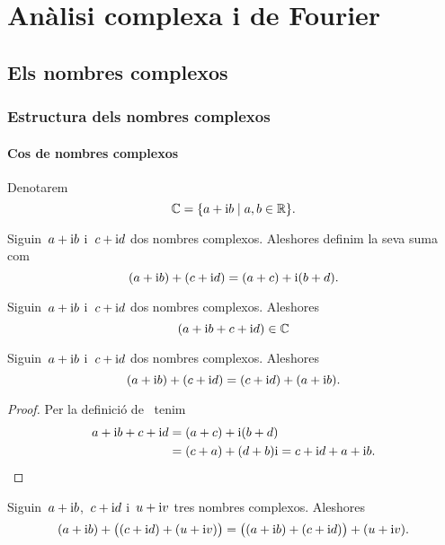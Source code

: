 \documentclass[../Apunts.tex]{subfiles}
\begin{document}
\part{Anàlisi complexa i de Fourier}
\chapter{Els nombres complexos}
\section{Estructura dels nombres complexos}
	\subsection{Cos de nombres complexos}
	\begin{notation}
		\label{notation:cos de nombres complexos}
		Denotarem
		\[\mathbb{C}=\{a+\mathrm{i} b\mid a,b\in\mathbb{R}\}.\]
	\end{notation}
	\begin{definition}
		\label{def:suma de nombres complexos}
		Siguin~\(a+\mathrm{i} b\) i~\(c+\mathrm{i} d\) dos nombres complexos. Aleshores definim la seva suma com
		\[(a+\mathrm{i} b)+(c+\mathrm{i} d)=(a+c)+\mathrm{i}(b+d).\]
	\end{definition}
	\begin{observation}
		\label{obs:els nombres complexos estan tancats per la suma}
		Siguin~\(a+\mathrm{i} b\) i~\(c+\mathrm{i} d\) dos nombres complexos. Aleshores
		\[(a+\mathrm{i} b+c+\mathrm{i} d)\in\mathbb{C}\]
	\end{observation}
	\begin{proposition}
		\label{prop:els nombres complexos commuten per la suma}
		\label{prop:el producte de nombres complexos és commutatiu}
		Siguin~\(a+\mathrm{i} b\) i~\(c+\mathrm{i} d\) dos nombres complexos. Aleshores
		\[(a+\mathrm{i} b)+(c+\mathrm{i} d)=(c+\mathrm{i} d)+(a+\mathrm{i} b).\]
	\end{proposition}
	\begin{proof}
		Per la definició de~ tenim
		\begin{align*}
			a+\mathrm{i} b+c+\mathrm{i} d&=(a+c)+\mathrm{i}(b+d) \\
			&=(c+a)+(d+b)\mathrm{i}=c+\mathrm{i} d+a+\mathrm{i} b.\qedhere
		\end{align*}
	\end{proof}
	\begin{proposition}
		\label{prop:els nombres complexos són associatius per la suma}
		Siguin~\(a+\mathrm{i} b\),~\(c+\mathrm{i} d\) i~\(u+\mathrm{i} v\) tres nombres complexos. Aleshores
		\[(a+\mathrm{i} b)+\big((c+\mathrm{i} d)+(u+\mathrm{i} v)\big)=\big((a+\mathrm{i} b)+(c+\mathrm{i} d)\big)+(u+\mathrm{i} v).\]
	\end{proposition}
\end{document}
